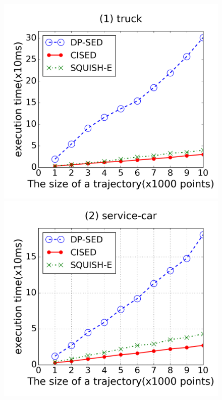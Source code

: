 \begin{figure}[tb!]
\centering
\includegraphics[scale = 0.25]{figures/Exp-time-size-truck.png}
\includegraphics[scale = 0.25]{figures/Exp-time-size-service.png}

\end{figure}
